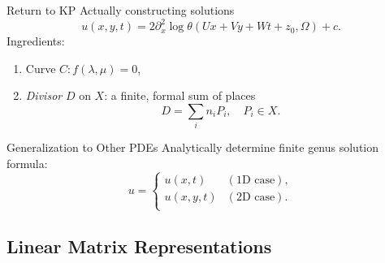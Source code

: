 \documentclass{beamer}
\begin{document}
\begin{frame}{Return to KP}{}
Actually constructing solutions
\[
  u(x,y,t) = 2 \partial_x^2 \log \theta(Ux + Vy + Wt + z_0, \Omega) + c.
\]
Ingredients:
\begin{enumerate}
  \item<2-> Curve $C : f(\lambda,\mu) = 0$,
  \item<3-> {\it Divisor} $D$ on $X$: a finite, formal sum of places
    \[
    D = \sum_i n_i P_i, \quad P_i \in X.
    \]
\end{enumerate}

\end{frame}



\begin{frame}{Generalization to Other PDEs}{}
  Analytically determine finite genus solution formula:
  \[
      u = \left\{
      \begin{array}{ll}
        u(x,t)   & (\text{1D case}), \\
        u(x,y,t) & (\text{2D case}). \\
      \end{array}
      \right.
  \]


  \vspace{16pt}

\end{frame}



\subsection{Linear Matrix Representations}
\end{document}
